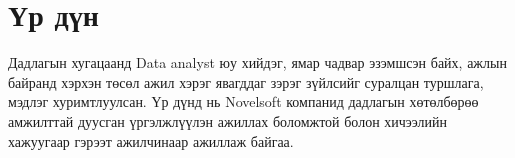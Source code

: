 \section{Үр дүн}
	Дадлагын хугацаанд Data analyst юу хийдэг, ямар чадвар эзэмшсэн байх, ажлын байранд хэрхэн төсөл ажил хэрэг явагддаг зэрэг зүйлсийг суралцан туршлага, мэдлэг хуримтлуулсан. Үр дүнд нь Novelsoft компанид дадлагын хөтөлбөрөө амжилттай дуусган үргэлжлүүлэн ажиллах боломжтой болон хичээлийн хажуугаар гэрээт ажилчинаар ажиллаж байгаа. 

